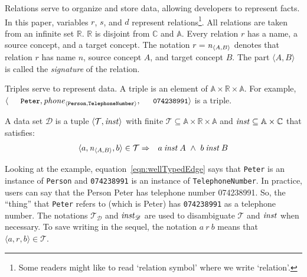 \documentclass[runningheads]{llncs}
\newcommand{\id}[1]{\text{\it #1\/}}
\newcommand{\instance}{\mathbin{\id{inst}}}
\newcommand{\declare}[3]{\id{#1}_{\pair{#2}{#3}}}
\newcommand{\pair}[2]{\langle{#1},{#2}\rangle}
\newcommand{\Pair}[2]{#1\times#2}
\newcommand{\triple}[3]{\langle{#1},{#2},{#3}\rangle}
\newcommand{\atom}[1]{{\tt\small #1}}
\newcommand{\Atoms}{\mathbb{A}}
\newcommand{\Concepts}{\mathbb{C}}
\newcommand{\Rels}{\mathbb{R}}   %
\newcommand{\triples}{\mathcal{T}}
\newcommand{\Triple}[3]{#1\times#2\times#3}
\newcommand{\dataset}{\mathscr{D}}
\def\define#1{\label{dfn:#1}{\em #1}\index{#1}}
\begin{document}
   Relations serve to organize and store data, allowing developers to represent facts.
   In this paper, variables $r$, $s$, and $d$ represent relations\footnote{Some readers might like to read `relation symbol' where we write `relation'.}.
   All relations are taken from an infinite set $\Rels$.
   $\Rels$ is disjoint from $\Concepts$ and $\Atoms$.
   Every relation $r$ has a name, a source concept, and a target concept.
   The notation $r=\declare{n}{A}{B}$ denotes that relation $r$ has name $n$, source concept $A$, and target concept $B$.
   The part $\pair{A}{B}$ is called the \define{signature} of the relation.
   
   Triples serve to represent data.
   A triple %
   is an element of $\Triple{\Atoms}{\Rels}{\Atoms}$.
   For example, $\triple{\text{\atom{Peter}}}{\declare{\id{phone}}{\tt Person}{\tt TelephoneNumber}}{\text{\atom{074238991}}}$ is a triple.
   
   \begin{definition}
   A data set $\dataset$ is a tuple $\pair{\triples}{\instance}$ with finite $\triples \subseteq {\Triple{\Atoms}{\Rels}{\Atoms}}$ and $\instance\subseteq\Pair{\Atoms}{\Concepts}$ that satisfies:
\begin{eqnarray}
   \triple{a}{\declare{n}{A}{B}}{b}\in\triples&\Rightarrow&a\instance A\ \wedge\ b\instance B
\label{eqn:wellTypedEdge}
\end{eqnarray}
\end{definition}
   Looking at the example,
   equation~\ref{eqn:wellTypedEdge} says that \atom{Peter} is an instance of {\tt Person} and \atom{074238991} is an instance of {\tt TelephoneNumber}.
   In practice, users can say that the Person Peter has telephone number 074238991.
   So, the ``thing'' that \atom{Peter} refers to (which is Peter) has \atom{074238991} as a telephone number.
   The notations $\triples_{\dataset}$ and $\instance_{\dataset}$ are used to disambiguate $\triples$ and $\instance$ when necessary.
   To save writing in the sequel, the notation $a\ r\ b$ means that $\triple{a}{r}{b}\in\triples$.
\end{document}
